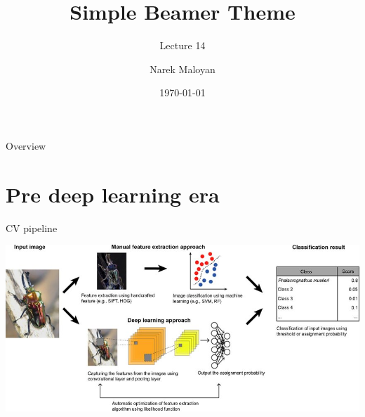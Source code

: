 \documentclass[aspectratio=169,xcolor=dvipsnames]{beamer}
\title[short title]{Simple Beamer Theme}
\subtitle{Lecture 14}
\author[Narek Maloyan] {Narek Maloyan}
\institute[NTU] %
{
    Faculty of Computational Mathematics and Cybernetics \\
    Lomonosov Moscow State University
    \vskip 3pt
}
\date{\today} %
\begin{document}
\begin{frame}
    \titlepage
\end{frame}

\begin{frame}{Overview}
    \tableofcontents
\end{frame}

\section{Pre deep learning era}

\begin{frame}{CV pipeline}
    \begin{center}
        \includegraphics[width=\textheight]{../images/Schematic-diagram-of-computer-vision-machine-learning-pipeline-for-image-based-species.png}
    \end{center}
\end{frame}
\end{document}
